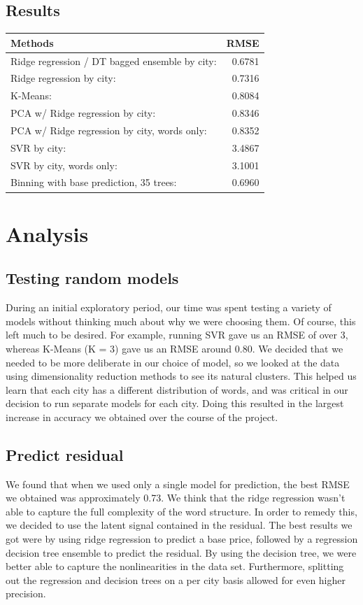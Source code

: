 \documentclass[11pt]{article}
\begin{document}
\subsection*{Results}
\begin{center}
\begin{tabular}{| l || r |}
\hline
\textbf{Methods}									&	\textbf{RMSE}   \\ \hline \hline
Ridge regression / DT bagged ensemble by city:  	&	0.6781 \\ \hline
Ridge regression by city:							&	0.7316 \\ \hline
K-Means: 											&	0.8084 \\ \hline
PCA w/ Ridge regression by city: 					&	0.8346 \\ \hline
PCA w/ Ridge regression by city, words only: 		&	0.8352 \\ \hline
SVR by city: 										&	3.4867 \\ \hline
SVR by city, words only: 							&	3.1001 \\ \hline
Binning with base prediction, 35 trees: 			&	0.6960 \\ \hline
\end{tabular}
\end{center}
\section{Analysis}

\subsection{Testing random models}
During an initial exploratory period, our time was spent testing a variety of models without thinking much about why we were choosing them. Of course, this left much to be desired. For example, running SVR gave us an RMSE of over 3, whereas K-Means (K = 3) gave us an RMSE around 0.80. We decided that we needed to be more deliberate in our choice of model, so we looked at the data using dimensionality reduction methods to see its natural clusters. This helped us learn that each city has a different distribution of words, and was critical in our decision to run separate models for each city. Doing this resulted in the largest increase in accuracy we obtained over the course of the project.

\subsection{Predict residual}
We found that when we used only a single model for prediction, the best RMSE we obtained was approximately 0.73. We think that the ridge regression wasn't able to capture the full complexity of the word structure. In order to remedy this, we decided to use the latent signal contained in the residual. The best results we got were by using ridge regression to predict a base price, followed by a regression decision tree ensemble to predict the residual. By using the decision tree, we were better able to capture the nonlinearities in the data set. Furthermore, splitting out the regression and decision trees on a per city basis allowed for even higher precision.
\end{document}
